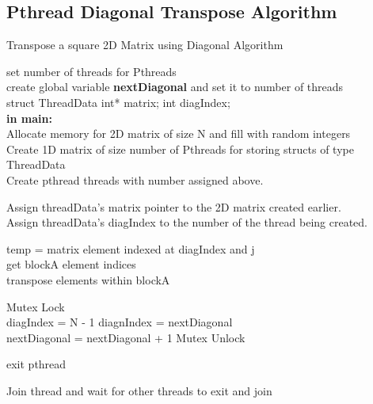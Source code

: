 \documentclass[10pt,onecolumn]{article}
\begin{document}
\subsection{Pthread Diagonal Transpose Algorithm}
%
\begin{algorithm}[H]
    \caption{Transpose a square 2D Matrix using Diagonal Algorithm}
    set number of threads for Pthreads\\
    create global variable \textbf{nextDiagonal} and set it to number of threads \\
    struct ThreadData{ int* matrix; int diagIndex;} \\
    
    \textbf{in main:} \\
    Allocate memory for 2D matrix of size N and fill with random integers \\
    Create 1D matrix of size number of Pthreads for storing structs of type ThreadData \\
    Create pthread threads with number assigned above.\\
    
    {   
        Assign threadData's matrix pointer to the 2D matrix created earlier.\\
        Assign threadData's diagIndex to the number of the thread being created.\\
        {
            {
                temp = matrix element indexed at diagIndex and j \\
                get blockA element indices\\
                transpose elements within blockA\\
            }
            
            Mutex Lock\\
             {diagIndex = N - 1}
            \Else
            { 
                diagnIndex = nextDiagonal \\
                nextDiagonal = nextDiagonal + 1
            }
            Mutex Unlock\\
            
        }
        exit pthread
    }
    
    {
        Join thread and wait for other threads to exit and join
    }
\end{algorithm}
%
\end{document}

